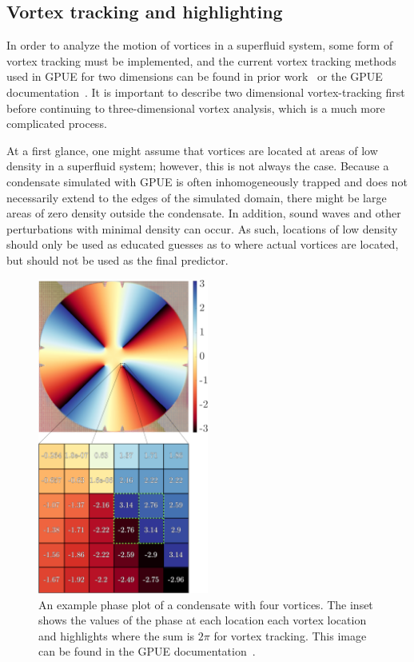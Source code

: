 \subsection{Vortex tracking and highlighting}
\label{sec:tracking}

In order to analyze the motion of vortices in a superfluid system, some form of vortex tracking must be implemented, and the current vortex tracking methods used in GPUE for two dimensions can be found in prior work~\cite{o2017} or the GPUE documentation~\cite{docs}.
It is important to describe two dimensional vortex-tracking first before continuing to three-dimensional vortex analysis, which is a much more complicated process.

At a first glance, one might assume that vortices are located at areas of low density in a superfluid system; however, this is not always the case.
Because a condensate simulated with GPUE is often inhomogeneously trapped and does not necessarily extend to the edges of the simulated domain, there might be large areas of zero density outside the condensate.
In addition, sound waves and other perturbations with minimal density can occur.
As such, locations of low density should only be used as educated guesses as to where actual vortices are located, but should not be used as the final predictor.

\begin{figure}
\center \includegraphics[width = 0.5\textwidth]{data/gpu/vortex_tracking/phi_grid.png}
\caption{An example phase plot of a condensate with four vortices.
The inset shows the values of the phase at each location each vortex location and highlights where the sum is $2\pi$ for vortex tracking.
This image can be found in the GPUE documentation~\cite{docs}.
}
\label{fig:phase_track}
\end{figure}

